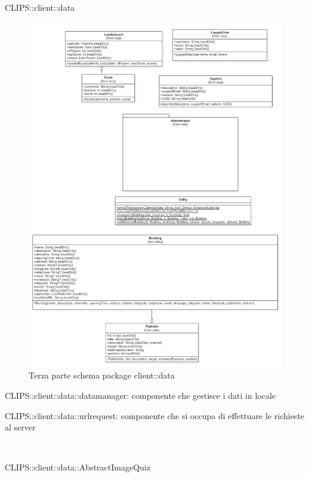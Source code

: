 \begin{componente}{CLIPS::client::data}
\begin{figure}[h!]
 \includegraphics[scale=0.3]{img/package/png/client--data3.png}
 \caption{Terza parte schema package client::data}
\end{figure}
\begin{compPackageContenuti}
\item CLIPS::client::data::datamanager: componente che gestisce i dati in locale
\item CLIPS::client::data::urlrequest: componente che si occupa di effettuare le richieste al server
\end{compPackageContenuti}
\begin{compClassi} \\
\begin{classe}{CLIPS::client::data::AbstractImageQuiz}

\end{classe}
\end{compClassi}
\end{componente}
